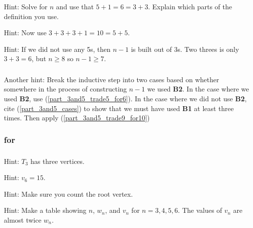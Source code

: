 \subsubsection*{ \answers}
\begin{apart}
    \item Hint: Solve for $n$ and use that $5+1=6=3+3$. Explain which parts of the definition you use.
    \item Hint: Now use $3+3+3+1=10=5+5$.
    \item Hint: If we did not use any 5s, then $n-1$ is built out of 3s.  Two threes is only $3+3=6$, but $n \ge 8$ so $n-1 \ge 7$.
\end{apart}

\subsubsection*{ \answers}
Another hint: Break the inductive step into two cases based on whether somewhere in the process of constructing $n-1$ we used \textbf{B2}.  In the case where we used \textbf{B2}, use  (\ref{part_3and5_trade5_for6}).  In the case where we did not use \textbf{B2}, cite  (\ref{part_3and5_cases}) to show that we must have used \textbf{B1} at least three times. Then apply (\ref{part_3and5_trade9_for10})

\subsubsection{\answers for  \subrecgraphs}

\subsubsection*{ \answers}
\begin{apart}
    \item Hint: $T_3$ has three vertices.
    \item Hint: $v_6=15$.  
    \item Hint: Make sure you count the root vertex.
    \item Hint: Make a table showing $n$, $w_n$, and $v_n$ for $n=3,4,5,6$.  The values of $v_n$ are almost twice $w_n$.
\end{apart}

